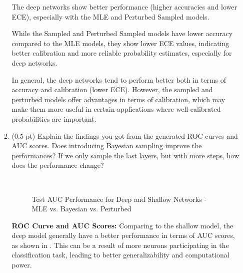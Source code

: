 \begin{enumerate}
\begin{enumerate}
The deep networks show better performance (higher accuracies and lower ECE),
especially with the MLE and Perturbed Sampled models.

While the Sampled and Perturbed Sampled models have lower accuracy compared to
the MLE models, they show lower ECE values, indicating better calibration and
more reliable probability estimates, especially for deep networks.  

In general, the deep networks tend to perform better both in terms of accuracy
and calibration (lower ECE). However, the sampled and perturbed models offer
advantages in terms of calibration, which may make them more useful in certain
applications where well-calibrated probabilities are important.


    \item (0.5 pt) Explain the findings you got from the generated ROC curves and AUC scores. Does introducing Bayesian sampling improve the performances? If we only sample the last layers, but with more steps, how does the performance change?

\begin{figure}[h!]
    \centering
     \\
    \caption{Test AUC Performance for Deep and Shallow Networks - MLE vs. Bayesian vs. Perturbed}
    \label{fig:test_auc_performance}
\end{figure}


    \textbf{ROC Curve and AUC Scores:} Comparing to the shallow model, the deep
    model generally have a better performance in terms of AUC scores, as shown
    in . This can be a result of more neurons
    participating in the classification task, leading to better generalizability
    and computational power. \\


\end{enumerate}
\end{enumerate}
